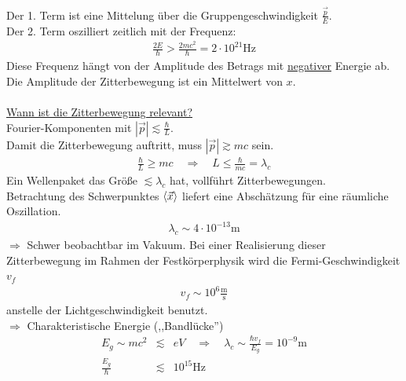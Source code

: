 Der 1. Term ist eine Mittelung über die Gruppengeschwindigkeit $\frac{\vec p}E$.\\
Der 2. Term oszilliert zeitlich mit der Frequenz:
\begin{eqnarray*}
\frac{2E}\hbar > \frac{2mc^2}\hbar = 2 \cdot 10^{21 } \text{Hz}
\end{eqnarray*}
Diese Frequenz hängt von der Amplitude des Betrags mit \underline{negativer} Energie ab.\\
Die Amplitude der Zitterbewegung ist ein Mittelwert von $x$.\\ \\
\underline{Wann ist die Zitterbewegung relevant?}\\
Fourier-Komponenten mit $|\vec p| \lesssim \frac \hbar L$.\\
Damit die Zitterbewegung auftritt, muss $|\vec p| \gtrsim m c$ sein.
\begin{eqnarray*}
\frac \hbar L \geq m c \quad \Rightarrow \quad L \leq \frac \hbar {m c} = \lambda _c
\end{eqnarray*}
Ein Wellenpaket das Größe $\lesssim \lambda_c$ hat, vollführt Zitterbewegungen.\\
Betrachtung des Schwerpunktes $\left < \vec x \right >$ liefert eine Abschätzung für eine räumliche Oszillation.
\begin{eqnarray*}
\lambda_c \sim 4 \cdot 10^{-13} \text{m}
\end{eqnarray*} $\Longrightarrow$ Schwer beobachtbar im Vakuum.\vspace{1cm}
Bei einer Realisierung dieser Zitterbewegung im Rahmen der Festkörperphysik wird die Fermi-Geschwindigkeit $v_f$
\begin{eqnarray*}
v_f \sim 10^6 \frac{\text{m}}{\text{s}}\end{eqnarray*}
 anstelle der Lichtgeschwindigkeit benutzt.\\
$\Longrightarrow$ Charakteristische Energie (,,Bandlücke'')
\begin{eqnarray*}
E_g \sim mc^2 &\lesssim& eV \quad\Rightarrow\quad \lambda_c \sim \frac {\hbar v_f}{E_g} = 10^{-9}\text{m}\\
\frac {E_g} \hbar &\lesssim& 10^{15}\text{Hz}
\end{eqnarray*}
